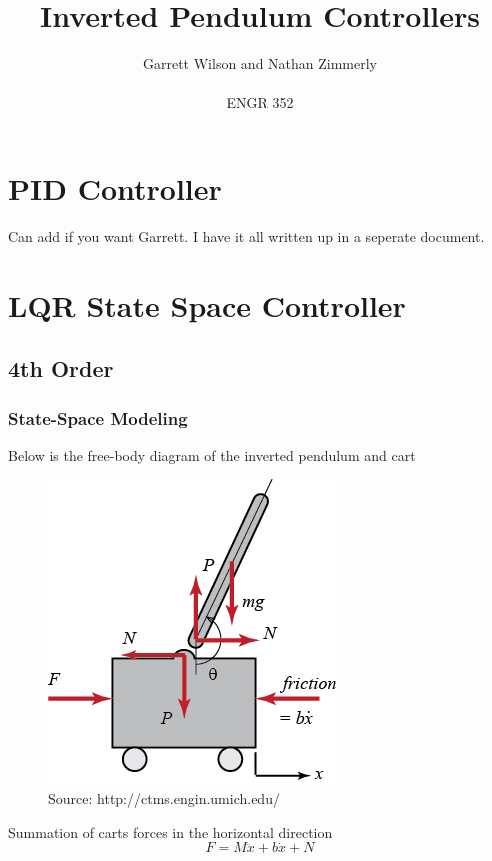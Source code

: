 \documentclass{article}
\begin{document}
\title{Inverted Pendulum Controllers}
\author{Garrett Wilson and Nathan Zimmerly \\ \\
ENGR 352}
\maketitle

\clearpage

\tableofcontents

\pagebreak

\section{PID Controller}
Can add if you want Garrett. I have it all written up in a seperate document.

\section{LQR State Space Controller}
\subsection{4th Order}
\subsubsection{State-Space Modeling}
Below is the free-body diagram of the inverted pendulum and cart

\begin{figure}[!htb]
\centering
\includegraphics{pendulumfbd}
\caption{Source: http://ctms.engin.umich.edu/}
\end{figure}

Summation of carts forces in the horizontal direction
\begin{equation} 
\label{eqn1}
F = M\ddot{x}+b\dot{x} + N
\end{equation}
\end{document}
